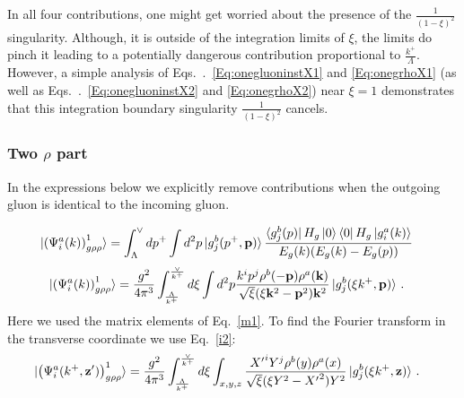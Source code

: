 \documentclass[aps,prd,amsmath,amssymb,nofootinbib]{revtex4-2}
\def\v#1{\mathbf{#1}}
\numberwithin{equation}{section}
\begin{document}
In all four contributions, one might get worried about the presence of the $\frac{1}{(1-\xi)^2}$ singularity. Although, it is outside of the integration limits of $\xi$, the limits do pinch it leading to a potentially dangerous contribution proportional to $\frac{k^+}{\Lambda}$. However, a simple analysis of Eqs.~.~\eqref{Eq:onegluoninstX1}  and \eqref{Eq:onegrhoX1}  (as well as Eqs.~.~\eqref{Eq:onegluoninstX2}  and \eqref{Eq:onegrhoX2}) near $\xi = 1$ demonstrates that this integration boundary singularity  $\frac{1}{(1-\xi)^2}$ cancels.   
\subsubsection{Two $\rho$ part}
In the expressions below we explicitly remove contributions when the outgoing gluon is identical to the incoming gluon.  
\begin{figure}[h]
\end{figure}
\begin{align}
  \ket{ \left(\Psi^{a}_{i}(k) \right)^{1}_{g \rho \rho} }%
   & =\int_{\Lambda}^{\vee} 
   d p^+ \int d^2p %
   \ket{g_{j}^{b}(p^+, \v{p})}%
   \frac{\bra{g_{j}^{b}(p)}H_{g}\ket{0}\bra{0}H_{g}\ket{g_{i}^{a}(k)}}{E_{g}(k) (E_{g}(k) - E_{g}(p))}
   \label{m1grr}
\end{align}  
\begin{align}
 \ket{ \left(\Psi^{a}_{i}(k) \right)^{1}_{g \rho \rho} }  & =  
   \frac{g^2}{4\pi^3}%
   \int_{\frac{\Lambda}{k^{+}}}^{\frac{\vee}{k^{+}}}
   d \xi\int d^2p\frac{k^{i}p^{j}\rho^{b}(-\v{p})\rho^{a}(\v{k})}{\sqrt{\xi}(\xi \v{k}^{2} -\v{p}^{2}) \v{k}^{2}}\ket{g_{j}^{b}(\xi k^+,\v{p})}\,.
\end{align}
Here we used the matrix elements of Eq.~\eqref{m1}. To find the Fourier transform in the transverse coordinate we use Eq.~\eqref{i2}:  
\begin{align}%
   \label{m1grrX}
  \ket{  \left(\Psi^{a}_{i}(k^+, \v{z'}) \right)^{1}_{g \rho \rho} }  %
   & = %
   \frac{g^2}{4\pi^3}%
    \int_{\frac{\Lambda}{k^{+}}}^{\frac{\vee}{k^{+}}}
   d \xi%
   \int_{x,y,z} \frac{{X'}^{i}Y^{j}\rho^{b}(y)\rho^{a}(x)}{\sqrt{\xi}(\xi Y^{2}-{X'}^{2}) {Y}^{2}}\ket{g_{j}^{b}(\xi k^+,\v{z})}\,. 
\end{align} 
\begin{figure}[h]
\end{figure}
\end{document}
